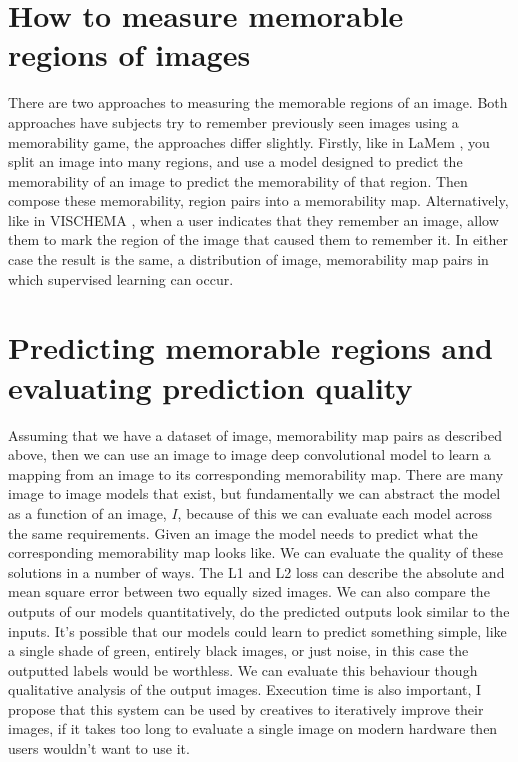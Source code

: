 \documentclass{UoYCSproject}
\begin{document}
\section{How to measure memorable regions of images} 

There are two approaches to measuring the memorable regions of an image. Both approaches have subjects try to remember previously seen images using a memorability game, the approaches differ slightly. Firstly, like in LaMem \cite{ICCV15_Khosla}, you split an image into many regions, and use a model designed to predict the memorability of an image to predict the memorability of that region. Then compose these memorability, region pairs into a memorability map. 
Alternatively, like in VISCHEMA \cite{VischemaPaper}, when a user indicates that they remember an image, allow them to mark the region of the image that caused them to remember it. 
In either case the result is the same, a distribution of image, memorability map pairs in which supervised learning can occur.

\section{Predicting memorable regions and evaluating prediction quality}

Assuming that we have a dataset of image, memorability map pairs as described above, then we can use an image to image deep convolutional model to learn a mapping from an image to its corresponding memorability map. 
There are many image to image models that exist, but fundamentally we can abstract the model as a function of an image, $I$, because of this we can evaluate each model across the same requirements. 
Given an image the model needs to predict what the corresponding memorability map looks like.
We can evaluate the quality of these solutions in a number of ways. The L1 and L2 loss can describe the absolute and mean square error between two equally sized images. We can also compare the outputs of our models quantitatively, do the predicted outputs look similar to the inputs. It's possible that our models could learn to predict something simple, like a single shade of green, entirely black images, or just noise, in this case the outputted labels would be worthless. We can evaluate this behaviour though qualitative analysis of the output images. Execution time is also important, I propose that this system can be used by creatives to iteratively improve their images, if it takes too long to evaluate a single image on modern hardware then users wouldn't want to use it.
\end{document}
